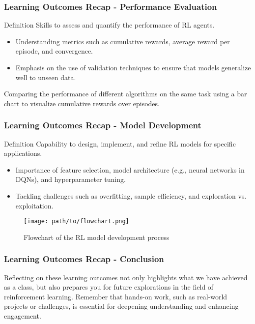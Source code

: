 \documentclass[aspectratio=169]{beamer}
\begin{document}
\begin{frame}[fragile]
    \frametitle{Learning Outcomes Recap - Performance Evaluation}
    \begin{block}{Definition}
        Skills to assess and quantify the performance of RL agents.
    \end{block}

    \begin{itemize}
        \item Understanding metrics such as cumulative rewards, average reward per episode, and convergence.
        \item Emphasis on the use of validation techniques to ensure that models generalize well to unseen data.
    \end{itemize}

    \begin{example}
        Comparing the performance of different algorithms on the same task using a bar chart to visualize cumulative rewards over episodes.
    \end{example}
\end{frame}

\begin{frame}[fragile]
    \frametitle{Learning Outcomes Recap - Model Development}
    \begin{block}{Definition}
        Capability to design, implement, and refine RL models for specific applications.
    \end{block}

    \begin{itemize}
        \item Importance of feature selection, model architecture (e.g., neural networks in DQNs), and hyperparameter tuning.
        \item Tackling challenges such as overfitting, sample efficiency, and exploration vs. exploitation.
    \end{itemize}

    \begin{example}
        \begin{figure}
            \centering
            \texttt{[image: path/to/flowchart.png]}
            \caption{Flowchart of the RL model development process}
        \end{figure}
    \end{example}
\end{frame}

\begin{frame}[fragile]
    \frametitle{Learning Outcomes Recap - Conclusion}
    Reflecting on these learning outcomes not only highlights what we have achieved as a class, but also prepares you for future explorations in the field of reinforcement learning. Remember that hands-on work, such as real-world projects or challenges, is essential for deepening understanding and enhancing engagement.
\end{frame}
\end{document}
